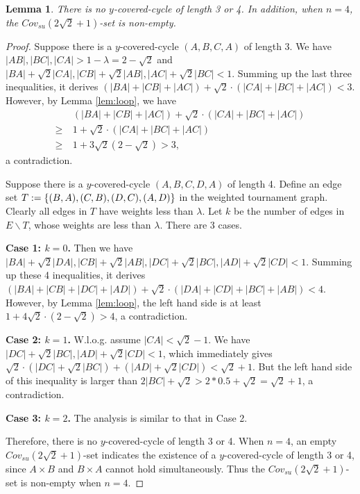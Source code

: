 \documentclass[11pt]{article}
\newtheorem{lemma}[theorem]{Lemma}
\theoremstyle{remark}
\begin{document}
\begin{lemma}\label{lem:n4}
 There is no $y$-covered-cycle of length 3 or 4. In addition, when $n=4$, the $Cov_{su}(2\sqrt2+1)$-set is non-empty.
 \end{lemma}
\begin{proof}
Suppose there is a $y$-covered-cycle $(A,B,C,A)$  of length 3.  We have $|AB|,|BC|,|CA|>1-\lambda=2-\sqrt2$ and $|BA|+\sqrt2|CA|, |CB|+\sqrt2|AB|, |AC|+\sqrt2|BC|<1$. Summing up the last three inequalities, it derives $(|BA|+|CB|+|AC|)+\sqrt2\cdot (|CA|+|BC|+|AC|)<3$. However, by Lemma \ref{lem:loop}, we have
\begin{align*}
&\ (|BA|+|CB|+|AC|)+\sqrt2\cdot (|CA|+|BC|+|AC|)\\
\ge &\ 1+\sqrt2\cdot (|CA|+|BC|+|AC|)\\
\ge &\ 1+3\sqrt2(2-\sqrt2) > 3,
\end{align*}
a contradiction.

Suppose there is a $y$-covered-cycle $(A,B,C,D,A)$  of length 4. Define an edge set $T:=\{(B,A),\\(C,B),(D,C),(A,D)\}$
in the weighted tournament graph. Clearly all edges in $T$ have weights less than $\lambda$. Let $k$ be the number of edges in $E\backslash T$, whose weights are less than $\lambda$. There are 3 cases.

 \vspace{1mm}\noindent\textbf{Case 1: $k=0$.}  Then we have $|BA|+\sqrt2|DA|, |CB|+\sqrt2|AB|, |DC|+\sqrt2|BC|, |AD|+\sqrt2|CD|<1$. Summing up these 4 inequalities, it derives $(|BA|+|CB|+|DC|+|AD|)+\sqrt2\cdot (|DA|+|CD|+|BC|+|AB|)<4$. However, by Lemma \ref{lem:loop}, the left hand side is at least $1+4\sqrt2\cdot (2-\sqrt2)>4$, a contradiction.

 \vspace{1mm}\noindent\textbf{Case 2: $k=1$.} W.l.o.g. assume $|CA|<\sqrt2-1$. We have $|DC|+\sqrt2|BC|,|AD|+\sqrt2|CD|<1$, which immediately gives
 $\sqrt2\cdot (|DC|+\sqrt2|BC|)+(|AD|+\sqrt2|CD|)<\sqrt2+1$.
  But the left hand side of this inequality is larger than $2|BC|+\sqrt2>2*0.5+\sqrt2=\sqrt2+1$, a contradiction.

 \vspace{1mm}\noindent\textbf{Case 3: $k=2$.} The analysis is similar to that in Case 2.

Therefore, there is no $y$-covered-cycle of length 3 or 4.  When $n=4$, an empty $Cov_{su}(2\sqrt2+1)$-set indicates the existence of a $y$-covered-cycle of length 3 or 4, since $A\times B$ and $B\times A$ cannot hold simultaneously. Thus the $Cov_{su}(2\sqrt2+1)$-set is non-empty when $n=4$.
\end{proof}
\end{document}
